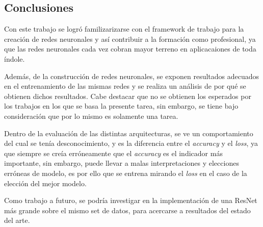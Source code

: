 \subsection{Conclusiones}
    
    Con este trabajo se logró familizarizarse con el framework de trabajo para la creación de redes neuronales y así contribuir a la formación como profesional, ya que las redes neuronales cada vez cobran mayor terreno en aplicacaiones de toda índole.
    
    Además, de la construcción de redes neuronales, se exponen resultados adecuados en el entrenamiento de las mismas redes y se realiza un análisis de por qué se obtienen dichos resultados. Cabe destacar que no se obtienen los esperados por los trabajos en los que se basa la presente tarea, sin embargo, se tiene bajo consideración que por lo mismo es solamente una tarea.
    
    Dentro de la evaluación de las distintas arquitecturas, se ve un comportamiento del cual se tenía desconocimiento, y es la diferencia entre el \textit{accuracy} y el \textit{loss}, ya que siempre se creía erróneamente que el \textit{accuracy} es el indicador más importante, sin embargo, puede llevar a malas interpretaciones y elecciones erróneas de modelo, es por ello que se entrena mirando el \textit{loss} en el caso de la elección del mejor modelo.
    
    Como trabajo a futuro, se podría investigar en la implementación de una ResNet más grande sobre el mismo set de datos, para acercarse a resultados del estado del arte.
    


